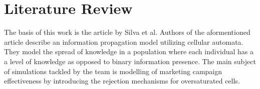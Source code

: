 
\chapter{Literature Review}

The basis of this work is the article by Silva et al\cite{Silva2020}.
Authors of the aformentioned article describe an information propagation model utilizing cellular automata.
They model the spread of knowledge in a population where each individual has a a level of knowledge as opposed to binary information presence.
The main subject of simulations tackled by the team is modelling of marketing campaign effectiveness by introducing the rejection mechanisms for oversaturated cells.

